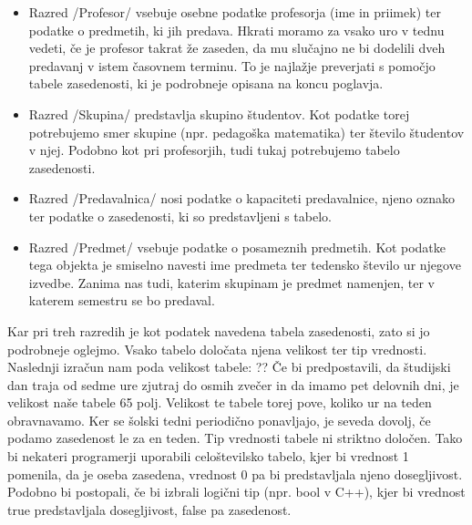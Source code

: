 \documentclass[a4paper,10pt]{article}
\begin{document}
   \begin{itemize}
      \item Razred /Profesor/ vsebuje osebne podatke profesorja (ime in priimek) ter
      podatke o predmetih, ki jih predava. Hkrati moramo za vsako uro v tednu vedeti, če
      je profesor takrat že zaseden, da mu slučajno ne bi dodelili dveh predavanj v istem
      časovnem terminu. To je najlažje preverjati s pomočjo tabele zasedenosti, ki je
      podrobneje opisana na koncu poglavja.
   
      \item Razred /Skupina/ predstavlja skupino študentov. Kot podatke torej potrebujemo
      smer skupine (npr. pedagoška matematika) ter število študentov v njej. Podobno kot pri
      profesorjih, tudi tukaj potrebujemo tabelo zasedenosti.
   
      \item Razred /Predavalnica/ nosi podatke o kapaciteti predavalnice, njeno oznako
      ter podatke o zasedenosti, ki so predstavljeni s tabelo.
   
      \item Razred /Predmet/ vsebuje podatke o posameznih predmetih. Kot podatke tega
      objekta je smiselno navesti ime predmeta ter tedensko število ur njegove izvedbe.
      Zanima nas tudi, katerim skupinam je predmet namenjen, ter v katerem semestru se bo
      predaval.
   \end{itemize}
   Kar pri treh razredih je kot podatek navedena tabela zasedenosti, zato si jo podrobneje
   oglejmo. Vsako tabelo določata njena velikost ter tip vrednosti. Naslednji izračun nam
   poda velikost tabele:
   ??
   Če bi predpostavili, da študijski dan traja od sedme ure zjutraj do osmih zvečer in da
   imamo pet delovnih dni, je velikost naše tabele 65 polj. Velikost te tabele torej pove,
   koliko ur na teden obravnavamo. Ker se šolski tedni periodično ponavljajo, je seveda
   dovolj, če podamo zasedenost le za en teden.
   Tip vrednosti tabele ni striktno določen. Tako bi nekateri programerji uporabili
   celoštevilsko tabelo, kjer bi vrednost 1 pomenila, da je oseba zasedena, vrednost 0
   pa bi predstavljala njeno dosegljivost. Podobno bi postopali, če bi izbrali logični
   tip (npr. bool v C++), kjer bi vrednost true predstavljala
   dosegljivost, false pa zasedenost.
   
\end{document}
